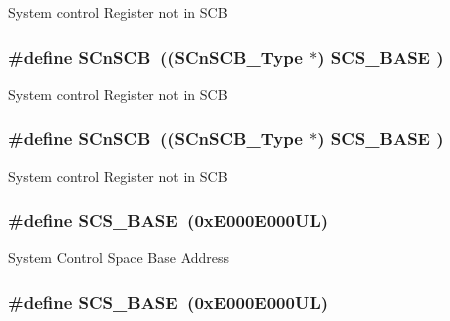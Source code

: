 System control Register not in S\-C\-B \hypertarget{group___c_m_s_i_s__core__base_ga9fe0cd2eef83a8adad94490d9ecca63f}{
\subsubsection[{S\-Cn\-S\-C\-B}]{\setlength{\rightskip}{0pt plus 5cm}\#define S\-Cn\-S\-C\-B~(({\bf S\-Cn\-S\-C\-B\-\_\-\-Type}    $\ast$)     {\bf S\-C\-S\-\_\-\-B\-A\-S\-E}      )}}\label{group___c_m_s_i_s__core__base_ga9fe0cd2eef83a8adad94490d9ecca63f}
System control Register not in S\-C\-B \hypertarget{group___c_m_s_i_s__core__base_ga9fe0cd2eef83a8adad94490d9ecca63f}{
\subsubsection[{S\-Cn\-S\-C\-B}]{\setlength{\rightskip}{0pt plus 5cm}\#define S\-Cn\-S\-C\-B~(({\bf S\-Cn\-S\-C\-B\-\_\-\-Type}    $\ast$)     {\bf S\-C\-S\-\_\-\-B\-A\-S\-E}      )}}\label{group___c_m_s_i_s__core__base_ga9fe0cd2eef83a8adad94490d9ecca63f}
System control Register not in S\-C\-B \hypertarget{group___c_m_s_i_s__core__base_ga3c14ed93192c8d9143322bbf77ebf770}{
\subsubsection[{S\-C\-S\-\_\-\-B\-A\-S\-E}]{\setlength{\rightskip}{0pt plus 5cm}\#define S\-C\-S\-\_\-\-B\-A\-S\-E~(0x\-E000\-E000\-U\-L)}}\label{group___c_m_s_i_s__core__base_ga3c14ed93192c8d9143322bbf77ebf770}
System Control Space Base Address \hypertarget{group___c_m_s_i_s__core__base_ga3c14ed93192c8d9143322bbf77ebf770}{
\subsubsection[{S\-C\-S\-\_\-\-B\-A\-S\-E}]{\setlength{\rightskip}{0pt plus 5cm}\#define S\-C\-S\-\_\-\-B\-A\-S\-E~(0x\-E000\-E000\-U\-L)}}\label{group___c_m_s_i_s__core__base_ga3c14ed93192c8d9143322bbf77ebf770}
